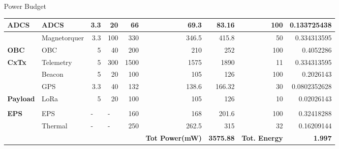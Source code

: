 \documentclass[aspectratio=169]{beamer}
\begin{document}
\begin{frame}{Power Budget}
\begin{table}[]
\begin{adjustbox}{width=\columnwidth,center}
\begin{tabular}{|l|l|r|r|r|r|r|r|r|}
					\rowcolor[HTML]{FFE6DD} 
					\textbf{ADCS} &
					ADCS &
					3.3 &
					20 &
					66 &
					69.3 &
					83.16 &
					100 &
					0.133725438 \\ \hline
					\rowcolor[HTML]{FFE6DD} 
					&
					Magnetorquer &
					3.3 &
					100 &
					330 &
					346.5 &
					415.8 &
					50 &
					0.334313595 \\ \hline
					\rowcolor[HTML]{FFE6DD} 
					\textbf{OBC} &
					OBC &
					5 &
					40 &
					200 &
					210 &
					252 &
					100 &
					0.4052286 \\ \hline
					\rowcolor[HTML]{FFE6DD} 
					\textbf{CxTx} &
					Telemetry &
					5 &
					300 &
					1500 &
					1575 &
					1890 &
					11 &
					0.334313595 \\ \hline
					\rowcolor[HTML]{FFE6DD} 
					&
					Beacon &
					5 &
					20 &
					100 &
					105 &
					126 &
					100 &
					0.2026143 \\ \hline
					\rowcolor[HTML]{FFE6DD} 
					&
					GPS &
					3.3 &
					40 &
					132 &
					138.6 &
					166.32 &
					30 &
					0.0802352628 \\ \hline
					\rowcolor[HTML]{FFE6DD} 
					\textbf{Payload} &
					LoRa &
					5 &
					20 &
					100 &
					105 &
					126 &
					10 &
					0.02026143 \\ \hline
					\rowcolor[HTML]{FFE6DD} 
					&
					&
					\multicolumn{1}{l|}{\cellcolor[HTML]{FFE6DD}} &
					\multicolumn{1}{l|}{\cellcolor[HTML]{FFE6DD}} &
					\multicolumn{1}{l|}{\cellcolor[HTML]{FFE6DD}} &
					\multicolumn{1}{l|}{\cellcolor[HTML]{FFE6DD}} &
					\multicolumn{1}{l|}{\cellcolor[HTML]{FFE6DD}} &
					\multicolumn{1}{l|}{\cellcolor[HTML]{FFE6DD}} &
					\multicolumn{1}{l|}{\cellcolor[HTML]{FFE6DD}} \\ \hline
					\rowcolor[HTML]{FFE6DD} 
					\textbf{EPS} &
					EPS &
					\multicolumn{1}{l|}{\cellcolor[HTML]{FFE6DD}-} &
					\multicolumn{1}{l|}{\cellcolor[HTML]{FFE6DD}-} &
					160 &
					168 &
					201.6 &
					100 &
					0.32418288 \\ \hline
					\rowcolor[HTML]{FFE6DD} 
					&
					Thermal &
					\multicolumn{1}{l|}{\cellcolor[HTML]{FFE6DD}-} &
					\multicolumn{1}{l|}{\cellcolor[HTML]{FFE6DD}-} &
					250 &
					262.5 &
					315 &
					32 &
					0.16209144 \\ \hline
					\rowcolor[HTML]{FFE6DD} 
					&
					&
					\multicolumn{1}{l|}{\cellcolor[HTML]{FFE6DD}} &
					\multicolumn{1}{l|}{\cellcolor[HTML]{FFE6DD}} &
					\multicolumn{1}{l|}{\cellcolor[HTML]{FFE6DD}} &
					\multicolumn{1}{l|}{\cellcolor[HTML]{FFE6DD}\textbf{Tot Power(mW)}} &
					\textbf{3575.88} &
					\multicolumn{1}{l|}{\cellcolor[HTML]{FFE6DD}\textbf{Tot. Energy}} &
					\textbf{1.997} \\ \hline
				\end{tabular}
			\end{adjustbox}
		\end{table}
		
		
	\end{frame}
\end{document}

